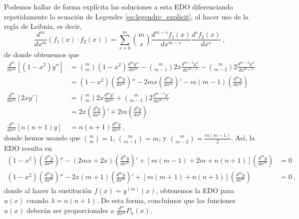 Podemos hallar de forma explícita las soluciones a esta EDO diferenciando repetidamente la ecuación de Legendre \eqref{eq:legendre_explicit}, al hacer uso de la regla de Leibniz, es decir,
\begin{equation}
    \frac{d^m}{dx^m}\left( f_1(x) \cdot f_2(x) \right) = \sum_{s=0}^{m} \binom{m}{s} \frac{d^{m-s}f_1(x)}{dx^{m-s}} \frac{d^s f_2(x)}{dx^s} \ ,
\end{equation}
de donde obtenemos que
\begin{align*}
    \frac{d^m}{dx^m}\left[ (1-x^2)y'' \right] & = \binom{m}{m} (1-x^2) \frac{d^m y''}{dx^m} - \binom{m}{m-1} 2x \frac{d^{m-1} y''}{dx^{m-1}}  - \binom{m}{m-2} 2 \frac{d^{m-2} y''}{dx^{m-2}} \\
    & = (1-x^2) \left(\frac{d^m y}{dx^m}\right)'' - 2mx \left(\frac{d^m y}{dx^m}\right)' - m(m-1)\left(\frac{d^m y}{dx^m}\right)  \\
    \frac{d^m}{dx^m}\left[ 2x y' \right] & = \binom{m}{m} 2x \frac{d^m y'}{dx^m} + \binom{m}{m-1} 2 \frac{d^{m-1} y'}{dx^{m-1}} \\
    & = 2x \left(\frac{d^2 y}{dx^2}\right)' + 2m \left(\frac{d^2 y}{dx^2}\right) \\
    \frac{d^m}{dx^m}\left[ n(n+1)y \right] & = n(n+1) \frac{d^m y}{dx^m} \ ,
\end{align*}
donde hemos usando que $\binom{m}{m} = 1$, $\binom{m}{m-1} = m$, y $\binom{m}{m-2} = \frac{m(m-1)}{2}$. Así, la EDO resulta en
\begin{align*}
    (1-x^2)\left(\frac{d^m y}{dx^m}\right)'' - (2mx + 2x) \left(\frac{d^m y}{dx^m}\right)' + [m(m-1) + 2m + n(n+1)]\left(\frac{d^m y}{dx^m}\right) & = 0 \\
    (1-x^2)\left(\frac{d^m y}{dx^m}\right)'' - 2x(m + 1) \left(\frac{d^m y}{dx^m}\right)' + [m(m+1) + n(n+1)]\left(\frac{d^m y}{dx^m}\right) & = 0 \ , 
\end{align*}
donde al hacer la sustitución $f(x) = y^{(m)}(x)$, obtenemos la EDO para $u(x)$ cuando $\lambda = n(n+1)$. De esta forma, concluímos que las funciones $u(x)$ deberán ser proporcionales a $\frac{d^m }{dx^m} P_n(x)$.

